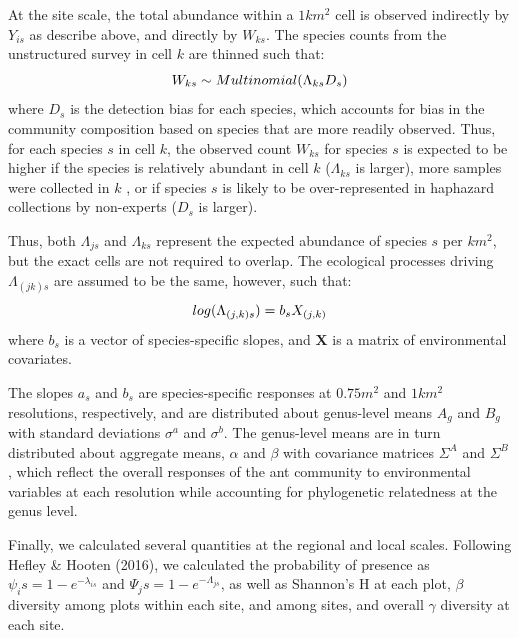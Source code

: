 \documentclass[preprint,review,times,12pt]{elsarticle}
\begin{document}
At the site scale, the total abundance within a $1 km^2$ cell is observed indirectly by $Y_{is}$ as describe above, and directly by $W_{ks}$. The species counts from the unstructured survey in cell $k$ are thinned such that:
\begin{equation}
W_{ks} \sim Multinomial(\Lambda_{ks}D_s) \\
\end{equation}
where $D_s$ is the detection bias for each species, which accounts for bias in the community composition based on species that are more readily observed. Thus, for each species $s$ in cell $k$, the observed count $W_{ks}$ for species $s$ is expected to be higher if the species is relatively abundant in cell $k$ ($\Lambda_{ks}$ is larger), more samples were collected in $k$ , or if species $s$ is likely to be over-represented in haphazard collections by non-experts ($D_s$ is larger).

Thus, both $\Lambda_{js}$ and $\Lambda_{ks}$ represent the expected abundance of species $s$ per $km^2$, but the exact cells are not required to overlap. The ecological processes driving $\Lambda_{(jk)s}$ are assumed to be the same, however, such that:
\begin{equation}
log(\Lambda_{(j,k)s}) = b_s X_{(j,k)} \\
\end{equation}
where $b_s$ is a vector of species-specific slopes, and $\mathbf{X}$ is a matrix of environmental covariates. 

The slopes $a_s$ and $b_s$ are species-specific responses at $0.75 m^2$ and $1 km^2$ resolutions, respectively, and are distributed about genus-level means $A_g$ and $B_g$ with standard deviations $\sigma^a$ and $\sigma^b$. The genus-level means are in turn distributed about aggregate means, $\alpha$ and $\beta$ with covariance matrices $\Sigma^A$ and $\Sigma^B$, which reflect the overall responses of the ant community to environmental variables at each resolution while accounting for phylogenetic relatedness at the genus level.

Finally, we calculated several quantities at the regional and local scales. Following Hefley \& Hooten (2016), we calculated the probability of presence as $\psi_is = 1 - e^{-\lambda_{is}}$ and $\Psi_js = 1 - e^{-\Lambda_{js}}$, as well as Shannon's H at each plot, $\beta$ diversity among plots within each site, and among sites, and overall $\gamma$ diversity at each site. 
\end{document}
